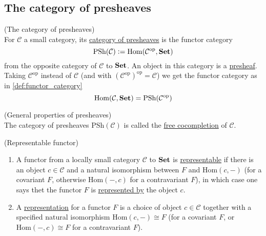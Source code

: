 
\subsection{The category of presheaves}

\begin{definition}{(The category of presheaves)}\\
For $\mathcal{C}$ a small category, its \ul{category of presheaves} is the functor category
\[ \mathrm{PSh}(\mathcal{C}) := \mathrm{Hom}(\mathcal{C}^{\text{op}}, \mathrm{\textbf{Set}}) \]
from the opposite category of $\mathcal{C}$ to $\mathrm{\textbf{Set}}$.
An object in this category is a \ul{presheaf}.\\
\noindent Taking $\mathcal{C}^{\text{op}}$ instead of $\mathcal{C}$ (and with $(\mathcal{C}^{\text{op}})^{\text{op}} = \mathcal{C}$) we get the
functor category as in \ref{def:functor_category}
\[
\mathrm{Hom}(\mathcal{C}, \mathrm{\textbf{Set}}) = \mathrm{PSh}(\mathcal{C}^{\text{op}}) \]
\end{definition}

\begin{remark}{(General properties of presheaves)}\\
The category of presheaves $\mathrm{PSh}(\mathcal{C})$ is called the \ul{free cocompletion} of $\mathcal{C}$.
\end{remark}

\begin{definition}{(Representable functor)}\label{def:repres_functor}
\begin{enumerate}
\renewcommand{\labelenumi}{(\theenumi)}
\item A functor from a locally small category $\mathcal{C}$ to $\mathrm{\textbf{Set}}$ is \ul{representable} if there is an object $c \in \mathcal{C}$ and a
natural isomorphism between $F$ and $\mathrm{Hom}(c,-)$ (for a covariant $F$, otherwise $\mathrm{Hom}(-,c)$ for a contravariant $F$),
in which case one says thet the functor $F$ is \ul{represented by} the object $c$.
\item A \ul{representation} for a functor $F$ is a choice of object $c \in \mathcal{C}$ together with a specified natural isomorphism
$\mathrm{Hom}(c,-) \cong F$ (for a covariant $F$, or $\mathrm{Hom}(-,c) \cong F$ for a contravariant $F$).
\end{enumerate}
\end{definition}

